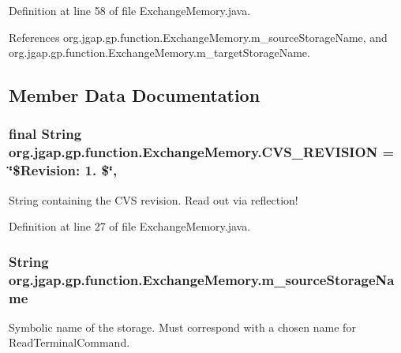 Definition at line 58 of file Exchange\-Memory.\-java.



References org.\-jgap.\-gp.\-function.\-Exchange\-Memory.\-m\-\_\-source\-Storage\-Name, and org.\-jgap.\-gp.\-function.\-Exchange\-Memory.\-m\-\_\-target\-Storage\-Name.



\subsection{Member Data Documentation}
\hypertarget{classorg_1_1jgap_1_1gp_1_1function_1_1_exchange_memory_a23861d9513491ff6a8e422098c5e1354}{
\subsubsection[{C\-V\-S\-\_\-\-R\-E\-V\-I\-S\-I\-O\-N}]{\setlength{\rightskip}{0pt plus 5cm}final String org.\-jgap.\-gp.\-function.\-Exchange\-Memory.\-C\-V\-S\-\_\-\-R\-E\-V\-I\-S\-I\-O\-N = \char`\"{}\$Revision\-: 1. \$\char`\"{}\hspace{0.3cm}{\ttfamily [static]}, {\ttfamily [private]}}}\label{classorg_1_1jgap_1_1gp_1_1function_1_1_exchange_memory_a23861d9513491ff6a8e422098c5e1354}
String containing the C\-V\-S revision. Read out via reflection! 

Definition at line 27 of file Exchange\-Memory.\-java.

\hypertarget{classorg_1_1jgap_1_1gp_1_1function_1_1_exchange_memory_ac94c29b7e908326420fe3ae8dc09690c}{
\subsubsection[{m\-\_\-source\-Storage\-Name}]{\setlength{\rightskip}{0pt plus 5cm}String org.\-jgap.\-gp.\-function.\-Exchange\-Memory.\-m\-\_\-source\-Storage\-Name\hspace{0.3cm}{\ttfamily [private]}}}\label{classorg_1_1jgap_1_1gp_1_1function_1_1_exchange_memory_ac94c29b7e908326420fe3ae8dc09690c}
Symbolic name of the storage. Must correspond with a chosen name for Read\-Terminal\-Command. 

